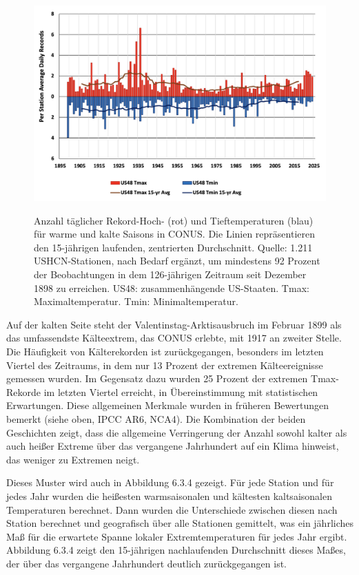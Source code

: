 \documentclass[12pt,paper=a4,DIV=12,parskip=never,chapterprefix=false,headings=standardclasses]{scrreprt}
\begin{document}
\begin{figure}[H]
\begin{center}
\includegraphics[width=1.0\textwidth]{bilder/bilderKlima-0044.png}\\[1cm]
\end{center}
\caption{Anzahl täglicher Rekord-Hoch- (rot) und Tieftemperaturen (blau) für warme und kalte Saisons in CONUS. Die Linien repräsentieren den 15-jährigen laufenden, zentrierten Durchschnitt. Quelle: 1.211 USHCN-Stationen, nach Bedarf ergänzt, um mindestens 92 Prozent der Beobachtungen in dem 126-jährigen Zeitraum seit Dezember 1898 zu erreichen. US48: zusammenhängende US-Staaten. Tmax: Maximaltemperatur. Tmin: Minimaltemperatur.}
\end{figure}

Auf der kalten Seite steht der Valentinstag-Arktisausbruch im Februar 1899 als das umfassendste Kälteextrem, das CONUS erlebte, mit 1917 an zweiter Stelle. Die Häufigkeit von Kälterekorden ist zurückgegangen, besonders im letzten Viertel des Zeitraums, in dem nur 13 Prozent der extremen Kälteereignisse gemessen wurden. Im Gegensatz dazu wurden 25 Prozent der extremen Tmax-Rekorde im letzten Viertel erreicht, in Übereinstimmung mit statistischen Erwartungen. Diese allgemeinen Merkmale wurden in früheren Bewertungen bemerkt (siehe oben, IPCC AR6, NCA4). Die Kombination der beiden Geschichten zeigt, dass die allgemeine Verringerung der Anzahl sowohl kalter als auch heißer Extreme über das vergangene Jahrhundert auf ein Klima hinweist, das weniger zu Extremen neigt.

Dieses Muster wird auch in Abbildung 6.3.4 gezeigt. Für jede Station und für jedes Jahr wurden die heißesten warmsaisonalen und kältesten kaltsaisonalen Temperaturen berechnet. Dann wurden die Unterschiede zwischen diesen nach Station berechnet und geografisch über alle Stationen gemittelt, was ein jährliches Maß für die erwartete Spanne lokaler Extremtemperaturen für jedes Jahr ergibt. Abbildung 6.3.4 zeigt den 15-jährigen nachlaufenden Durchschnitt dieses Maßes, der über das vergangene Jahrhundert deutlich zurückgegangen ist.
\end{document}
